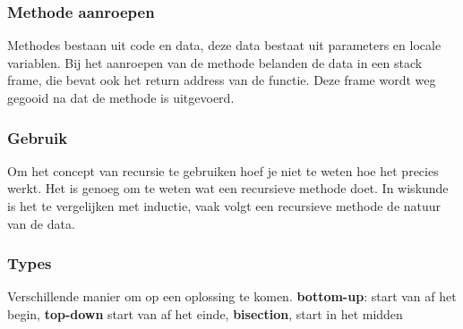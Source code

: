 \subsubsection{Methode aanroepen}
Methodes bestaan uit code en data, deze data bestaat uit parameters en locale variablen.
Bij het aanroepen van de methode belanden de data in een stack frame, die bevat ook het return address van de functie.
Deze frame wordt weg gegooid na dat de methode is uitgevoerd.

\subsubsection{Gebruik}
Om het concept van recursie te gebruiken hoef je niet te weten hoe het precies werkt.
Het is genoeg om te weten wat een recursieve methode doet.
In wiskunde is het te vergelijken met inductie, vaak volgt een recursieve methode de natuur van de data.

\subsubsection{Types}
Verschillende manier om op een oplossing te komen.
\textbf{bottom-up}: start van af het begin, \textbf{top-down} start van af het einde, \textbf{bisection}, start in het midden
